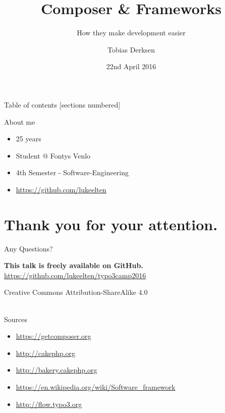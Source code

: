 \documentclass{beamer}
\title{Composer \& Frameworks}
\subtitle{How they make development easier}
\date{22nd April 2016}
\author{Tobias Derksen}
\institute{Fontys School of Technology \& Logistics}
\begin{document}
  \maketitle

  \begin{frame}{Table of contents}
    [sections numbered]
    \tableofcontents[hideallsubsections]
  \end{frame}


  \begin{frame}{About me}
  	\begin{itemize}
  		\item 25 years
  		\item Student @ Fontys Venlo
  		\item 4th Semester - Software-Engineering
  		\item \url{https://github.com/lukeelten}
  	\end{itemize}
  \end{frame}

  
  
  

	\section*{Thank you for your attention.}
	\begin{frame}[standout]
		Any Questions?
	\end{frame}
	
	\appendix
	
	\begin{frame}{}
		\textbf{This talk is freely available on GitHub.} \\
		\url{https://github.com/lukeelten/typo3camp2016}
		\vfill
		\begin{center}
			Creative Commons Attribution-ShareAlike 4.0 ~\\~\\
			\ccbysa
		\end{center}
	\end{frame}
	
	\begin{frame}{Sources}
		\begin{itemize}
			\item \url{https://getcomposer.org}
			\item \url{http://cakephp.org}
			\item \url{http://bakery.cakephp.org}
			\item \url{https://en.wikipedia.org/wiki/Software_framework}
			\item \url{http://flow.typo3.org}
		\end{itemize}
	\end{frame}
\end{document}
